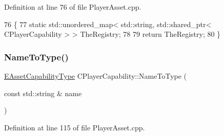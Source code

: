 Definition at line 76 of file Player\+Asset.\+cpp.


\begin{DoxyCode}
76                                                                                                   \{
77     \textcolor{keyword}{static} std::unordered\_map< std::string, std::shared\_ptr< CPlayerCapability > > TheRegistry;
78     
79     \textcolor{keywordflow}{return} TheRegistry;
80 \}
\end{DoxyCode}
\hypertarget{classCPlayerCapability_a920a696526e8a839f728192aea0ba1c5}{}\label{classCPlayerCapability_a920a696526e8a839f728192aea0ba1c5} 
\subsubsection{\texorpdfstring{Name\+To\+Type()}{NameToType()}}
{\footnotesize\ttfamily \hyperlink{GameDataTypes_8h_a35b98ce26aca678b03c6f9f76e4778ce}{E\+Asset\+Capability\+Type} C\+Player\+Capability\+::\+Name\+To\+Type (\begin{DoxyParamCaption}\item[{const std\+::string \&}]{name }\end{DoxyParamCaption})\hspace{0.3cm}{\ttfamily [static]}}



Definition at line 115 of file Player\+Asset.\+cpp.


